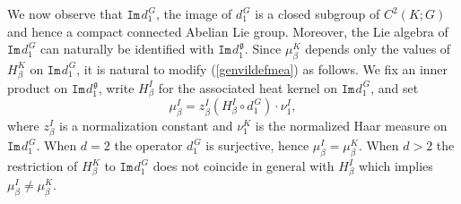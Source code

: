 \documentclass[11pt,reqno]{amsart}
\numberwithin{equation}{section}
\theoremstyle{remark}
\theoremstyle{rmdefinition}
\begin{document}
We now observe that $\mathtt{Im}\hspace{1pt}d_1^{\hspace{1pt}G}$, the image of $d_1^{\hspace{1pt}G}$ is a closed subgroup of $C^2(K;G)$ and hence a compact connected Abelian Lie group. Moreover, the Lie algebra of $\mathtt{Im}\hspace{1pt}d_1^{\hspace{1pt}G}$ can naturally be identified with $\mathtt{Im}\hspace{1pt}d_1^{\hspace{1pt}\mathfrak g}$. Since $\mu^K_{\beta}$ depends only the values of $H^K_{\beta}$ on $\mathtt{Im}\hspace{1pt}d_1^{\hspace{1pt}G}$, it is natural to modify (\ref{genvildefmea}) as follows. We fix an inner product on $\mathtt{Im}\hspace{1pt}d_1^{\hspace{1pt}\mathfrak g}$, write $H^I_{\beta}$ for the associated heat kernel on $\mathtt{Im}\hspace{1pt}d_1^{\hspace{1pt}G}$, and set
\begin{equation}\label{genvildefmod}
	\mu^I_{\beta}=z^I_\beta (H^I_{\beta} \circ d_1^{\hspace{1pt}G}) \cdot \nu^I_1,
\end{equation}
where $z^I_\beta$ is a normalization constant and $\nu^K_1$ is the normalized Haar measure on $\mathtt{Im}\hspace{1pt}d_1^{\hspace{1pt}G}$. When $d=2$ the operator $d_1^{\hspace{1pt}G}$ is surjective, hence $\mu^I_{\beta}=\mu^K_{\beta}$. When $d>2$ the restriction of $H^K_{\beta}$ to $\mathtt{Im}\hspace{1pt}d_1^{\hspace{1pt}G}$ does not coincide in general with $H^I_{\beta}$ which implies $\mu^I_{\beta} \neq \mu^K_{\beta}$.
\end{document}
